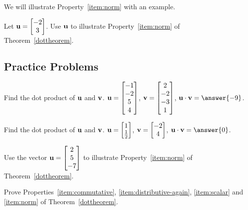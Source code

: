 \documentclass{ximera}
\renewcommand{\vec}[1]{{\bf #1}}
\newcommand{\dotp}{\cdot}
\begin{document}

We will illustrate Property~\ref{item:norm} with an example.
\begin{example}\label{exprop6}
  Let $\vec{u}=\begin{bmatrix}-2\\3\end{bmatrix}$.  Use $\vec{u}$ to illustrate Property~\ref{item:norm} of Theorem~\ref{dottheorem}.
\end{example}

\subsection*{Practice Problems}

\begin{problem}
Find the dot product of $\vec{u}$ and $\vec{v}$.
  $\vec{u}=\begin{bmatrix}-1\\-2\\5\\4\end{bmatrix}$, $\vec{v}=\begin{bmatrix}2\\-2\\-3\\1\end{bmatrix}$, $\vec{u} \dotp \vec{v} = \answer{-9}$.
\end{problem}

\begin{problem}
Find the dot product of $\vec{u}$ and $\vec{v}$. 
  $\vec{u}=\begin{bmatrix}1\\\frac{1}{2}\end{bmatrix}$, $\vec{v}=\begin{bmatrix}-2\\4\end{bmatrix}$, $\vec{u} \dotp \vec{v} = \answer{0}$.
\end{problem}

\begin{problem}
  Use the vector $\vec{u}=\begin{bmatrix}2\\5\\-7\end{bmatrix}$ to
  illustrate Property~\ref{item:norm} of Theorem~\ref{dottheorem}.
\end{problem}

\begin{problem}
  Prove Properties~\ref{item:commutative}, \ref{item:distributive-again}, \ref{item:scalar} and \ref{item:norm} of Theorem~\ref{dottheorem}.
\end{problem}
\end{document}
